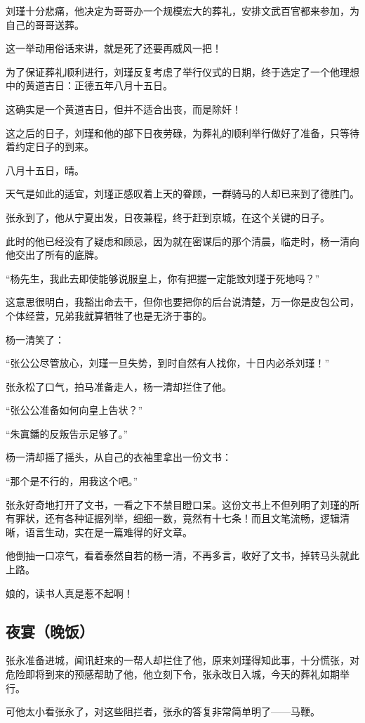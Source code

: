 \begin{multicols}{\theparacolNo}
刘瑾十分悲痛，他决定为哥哥办一个规模宏大的葬礼，安排文武百官都来参加，为自己的哥哥送葬。

这一举动用俗话来讲，就是死了还要再威风一把！

为了保证葬礼顺利进行，刘瑾反复考虑了举行仪式的日期，终于选定了一个他理想中的黄道吉日：正德五年八月十五日。

这确实是一个黄道吉日，但并不适合出丧，而是除奸！

这之后的日子，刘瑾和他的部下日夜劳碌，为葬礼的顺利举行做好了准备，只等待着约定日子的到来。

八月十五日，晴。

天气是如此的适宜，刘瑾正感叹着上天的眷顾，一群骑马的人却已来到了德胜门。

张永到了，他从宁夏出发，日夜兼程，终于赶到京城，在这个关键的日子。

此时的他已经没有了疑虑和顾忌，因为就在密谋后的那个清晨，临走时，杨一清向他交出了所有的底牌。

“杨先生，我此去即使能够说服皇上，你有把握一定能致刘瑾于死地吗？”

这意思很明白，我豁出命去干，但你也要把你的后台说清楚，万一你是皮包公司，个体经营，兄弟我就算牺牲了也是无济于事的。

杨一清笑了：

“张公公尽管放心，刘瑾一旦失势，到时自然有人找你，十日内必杀刘瑾！”

张永松了口气，拍马准备走人，杨一清却拦住了他。

“张公公准备如何向皇上告状？”

“朱寘鐇的反叛告示足够了。”

杨一清却摇了摇头，从自己的衣袖里拿出一份文书：

“那个是不行的，用我这个吧。”

张永好奇地打开了文书，一看之下不禁目瞪口呆。这份文书上不但列明了刘瑾的所有罪状，还有各种证据列举，细细一数，竟然有十七条！而且文笔流畅，逻辑清晰，语言生动，实在是一篇难得的好文章。

他倒抽一口凉气，看着泰然自若的杨一清，不再多言，收好了文书，掉转马头就此上路。

娘的，读书人真是惹不起啊！

\subsection{夜宴（晚饭）}
张永准备进城，闻讯赶来的一帮人却拦住了他，原来刘瑾得知此事，十分慌张，对危险即将到来的预感帮助了他，他立刻下令，张永改日入城，今天的葬礼如期举行。

可他太小看张永了，对这些阻拦者，张永的答复非常简单明了——马鞭。


\end{multicols}

